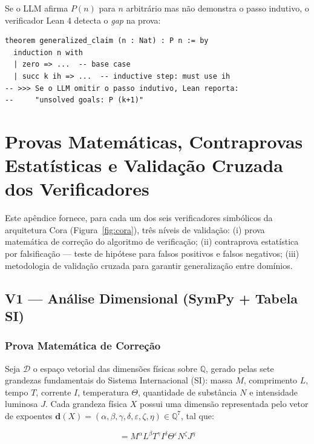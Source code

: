 \documentclass[5p]{elsarticle}
\theoremstyle{remark}
\begin{document}
Se o LLM afirma $P(n)$ para $n$ arbitrário mas não demonstra o passo indutivo, o verificador Lean 4 detecta o \textit{gap} na prova:

\begin{verbatim}
theorem generalized_claim (n : Nat) : P n := by
  induction n with
  | zero => ...  -- base case
  | succ k ih => ...  -- inductive step: must use ih
-- >>> Se o LLM omitir o passo indutivo, Lean reporta:
--     "unsolved goals: P (k+1)"
\end{verbatim}

\section{Provas Matemáticas, Contraprovas Estatísticas e Validação Cruzada dos Verificadores}

Este apêndice fornece, para cada um dos seis verificadores simbólicos da arquitetura Cora (Figura~\ref{fig:cora}), três níveis de validação: (i) prova matemática de correção do algoritmo de verificação; (ii) contraprova estatística por falsificação --- teste de hipótese para falsos positivos e falsos negativos; (iii) metodologia de validação cruzada para garantir generalização entre domínios.

\subsection{V1 --- Análise Dimensional (SymPy + Tabela SI)}

\subsubsection{Prova Matemática de Correção}

Seja $\mathcal{D}$ o espaço vetorial das dimensões físicas sobre $\mathbb{Q}$, gerado pelas sete grandezas fundamentais do Sistema Internacional (SI): massa $M$, comprimento $L$, tempo $T$, corrente $I$, temperatura $\Theta$, quantidade de substância $N$ e intensidade luminosa $J$. Cada grandeza física $X$ possui uma dimensão representada pelo vetor de expoentes $\mathbf{d}(X) = (\alpha, \beta, \gamma, \delta, \varepsilon, \zeta, \eta) \in \mathbb{Q}^7$, tal que:

\begin{equation}
[X] = M^\alpha L^\beta T^\gamma I^\delta \Theta^\varepsilon N^\zeta J^\eta
\label{eq:c1_dimvec}
\end{equation}
\end{document}
